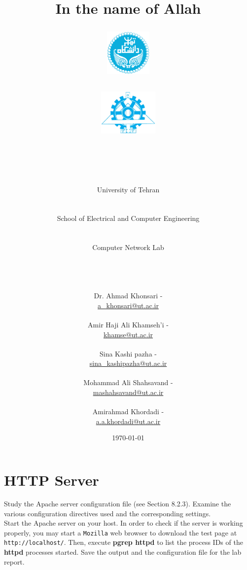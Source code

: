 \documentclass[10pt,a4paper]{article}
\title{
\normalsize In the name of Allah\\
\vspace{10pt}
\LARGE\FR{بسم \allah الرحمن الرحیم}
\vspace{10pt}
\begin{center}
    \begin{minipage}{0.48\textwidth}
        \begin{flushleft}
            \includegraphics[height=64pt,width=64pt]{../img/logo.png}
        \end{flushleft}
    \end{minipage}
    \begin{minipage}{0.48\textwidth}
        \begin{flushright}
            \includegraphics[height=64pt]{../img/eng-logo.png}
        \end{flushright}
    \end{minipage}
\end{center}
\vspace*{-64pt}
\huge \titleText\\
\vspace{40pt}
}
\author{
\huge University of Tehran\\
\LARGE \FR{دانشگاه تهران}\\
\\
\LARGE School of Electrical and Computer Engineering\\
\FR{دانشکده مهندسی برق و کامپیوتر}\\
\\
\Large Computer Network Lab\\
\FR{آزمایشگاه شبکه‌های کامپیوتری}\\
\\
\\
\\
\normalfont
Dr. Ahmad Khonsari - \FR{احمد خونساری}\\
\href{mailto:a_khonsari@ut.ac.ir}{a\_khonsari@ut.ac.ir}\\
\\
\normalsize
Amir Haji Ali Khamseh'i - \FR{امیر حاجی علی خمسه‌ء}\\
\href{mailto:khamse@ut.ac.ir}{khamse@ut.ac.ir}\\
\\
\normalsize
Sina Kashi pazha - \FR{سینا کاشی پزها}\\
\href{mailto:sina\_kashipazha@ut.ac.ir}{sina\_kashipazha@ut.ac.ir}\\
\\
\normalsize
Mohammad Ali Shahsavand - \FR{محمد علی شاهسوند}\\
\href{mailto:mashahsavand@ut.ac.ir}{mashahsavand@ut.ac.ir}\\
\\
\normalsize
Amirahmad Khordadi - \FR{امیر احمد خردادی}\\
\href{mailto:a.a.khordadi@ut.ac.ir}{a.a.khordadi@ut.ac.ir}
}
\date{\vspace{30pt}\today\\\vspace{10pt}{\selectlanguage{farsi}\today}}
\numberwithin{equation}{section}
\numberwithin{figure}{section}
\numberwithin{table}{section}
\begin{document}

    \maketitle


    \pagebreak




    \section{HTTP Server}
    Study the Apache server configuration file (see Section 8.2.3).
    Examine the various configuration directives used and the corresponding settings. \\
    Start the Apache server on your host.
    In order to check if the server is working properly, you may start a \texttt{Mozilla} web browser to download the test page at \texttt{http://localhost/}.
    Then, execute \textbf{pgrep httpd} to list the process IDs of the \textbf{httpd} processes started.
    Save the output and the configuration file for the lab report.
\end{document}
